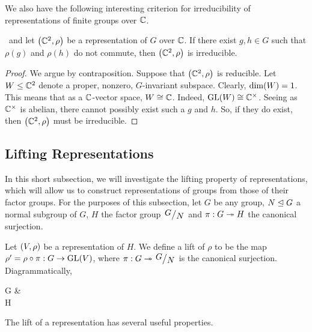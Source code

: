 We also have the following interesting criterion for irreducibility of representations of finite groups over $\mathbb{C}$.

\begin{lemma}
    \ and let $\left( \mathbb{C}^2, \rho \right)$ be a representation of $G$ over $\mathbb{C}$. If there exist $g, h \in G$ such that $\rho(g)$ and $\rho(h)$ do not commute, then $\left( \mathbb{C}^2, \rho \right)$ is irreducible.
\end{lemma}
\begin{proof}
    We argue by contraposition. Suppose that $\left( \mathbb{C}^2, \rho \right)$ is reducible. Let $W \leq \mathbb{C}^2$ denote a proper, nonzero, $G$-invariant subspace. Clearly, $\dim\!\left( W \right) = 1$. This means that as a $\mathbb{C}$-vector space, $W \cong \mathbb{C}$. Indeed, $\operatorname{GL}\!\left( W \right) \cong \mathbb{C}^{\times}$. Seeing as $\mathbb{C}^{\times}$ is abelian, there cannot possibly exist such a $g$ and $h$. So, if they do exist, then $\left( \mathbb{C}^2, \rho \right)$ must be irreducible.
\end{proof}

\subsection{Lifting Representations}

In this short subsection, we will investigate the lifting property of representations, which will allow us to construct representations of groups from those of their factor groups. For the purposes of this subsection, let $G$ be any group, $N \trianglelefteq G$ a normal subgroup of $G$, $H$ the factor group $\quotient{G}{N}$ and $\pi : G \twoheadrightarrow H$ the canonical surjection.

\begin{boxdefinition}
    Let $\left( V, \rho \right)$ be a representation of $H$. We define a lift of $\rho$ to be the map $\rho' = \rho \circ \pi : G \to \operatorname{GL}\!\left( V \right)$, where $\pi : G \surj \quotient{G}{N}$ is the canonical surjection. Diagrammatically,
    \begin{cd}
        G \arrow[r, "\rho'"]  &  \\
        H \arrow[ur, "\rho"']
    \end{cd}
\end{boxdefinition}

The lift of a representation has several useful properties.

